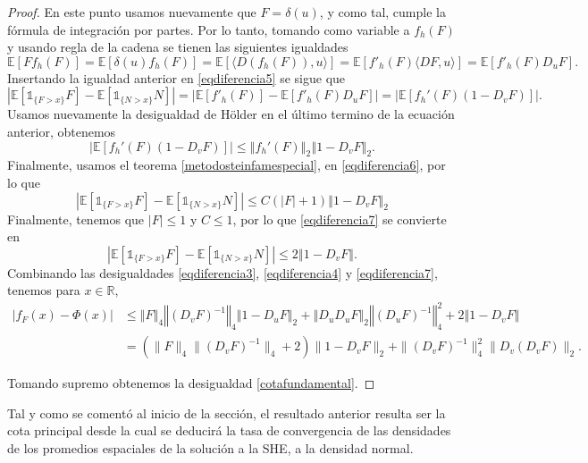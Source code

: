 \documentclass[letterpaper,twoside,12pt]{book}
\newcommand{\R}{\mathbb{R}}
\newcommand{\E}{\mathbb{E}}
\newcommand{\1}{\mathds{1}}
\newcommand{\abs}[1]{\left\lvert #1 \right\rvert}
\newcommand{\norm}[1]{\left\Vert #1 \right\Vert}
\theoremstyle{definition}
\theoremstyle{definition}
\theoremstyle{remark}
\theoremstyle{definition}
\theoremstyle{definition}
\theoremstyle{definition}
\theoremstyle{definition}
\theoremstyle{definition}
\begin{document}
\begin{proof}
En este punto usamos nuevamente que $F=\delta(u)$, y como tal, cumple la fórmula de integración por partes. Por lo tanto, tomando como variable a $f_h(F)$ y usando regla de la cadena se tienen las siguientes igualdades
\begin{equation*}
   \E\left[Ff_h(F)\right]=\E\left[\delta(u)f_h(F)\right]=\E\left[\langle D(f_h(F)),u\rangle\right]=\E\left[f'_h(F)\langle DF,u\rangle\right]=\E\left[f'_h(F)D_uF\right].
\end{equation*}
Insertando la igualdad anterior en \eqref{eqdiferencia5} se sigue que 
   \begin{equation*}
      \abs{\E\left[\1_{\{F>x\}}F\right]-\E\left[\1_{\{N>x\}}N\right]}=\abs{\E\left[f'_h(F)\right]-\E\left[f'_h(F)D_uF\right]}= \abs{\E\left[f_h'(F)(1-D_vF)\right]}.
   \end{equation*}
Usamos nuevamente la desigualdad de Hölder en el último termino de la ecuación anterior, obtenemos
\begin{equation}\label{eqdiferencia6}
   \abs{\E\left[f_h'(F)(1-D_vF)\right]}\leq \norm{f_h'(F)}_2\norm{1-D_vF}_2.
\end{equation}
Finalmente, usamos el teorema \ref{metodosteinfamespecial}, en \ref{eqdiferencia6}, por lo que 
\begin{equation}\label{eqdiferencia7}
      \abs{\E\left[\1_{\{F>x\}}F\right]-\E\left[\1_{\{N>x\}}N\right]}\leq C(\abs{F}+1)\norm{1-D_vF}_2
\end{equation}
Finalmente, tenemos que $|F|\leq 1$ y $C\leq 1$, por lo que \ref{eqdiferencia7} se convierte en 
\begin{equation}\label{eqdiferencia8}
   \abs{\E\left[\1_{\{F>x\}}F\right]-\E\left[\1_{\{N>x\}}N\right]}\leq2\norm{1-D_vF}.
\end{equation}
Combinando las desigualdades \ref{eqdiferencia3}, \ref{eqdiferencia4} y \ref{eqdiferencia7}, tenemos para $x\in \R$,
\begin{align*}
   \abs{f_F(x)-\Phi(x)}&\leq \norm{F}_4\norm{(D_vF)^{-1}}_4\norm{1-D_uF}_2+\norm{D_uD_uF}_2\norm{(D_uF)^{-1}}_4^{2}+2\norm{1-D_vF}\\
   &=\left(\|F\|_4\|\left(D_vF\right)^{-1}\|_4+2\right)\|1-D_vF\|_2+\|\left(D_vF\right)^{-1}\|_4^{2}\|D_v \left(D_vF\right)\|_2.   
\end{align*}

Tomando supremo obtenemos la desigualdad \eqref{cotafundamental}.
\end{proof}

Tal y como se comentó al inicio de la sección, el resultado anterior resulta ser la cota principal desde la cual se deducirá la tasa de convergencia de las densidades de los promedios espaciales de la solución a la SHE, a la densidad normal. 
\end{document}
